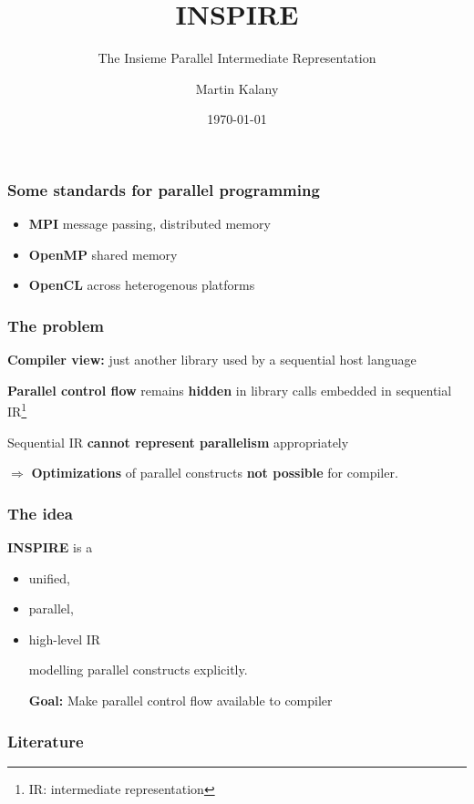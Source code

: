 \documentclass{beamer}
\title{INSPIRE}
\subtitle{The Insieme Parallel Intermediate Representation}
\author{Martin Kalany}
\institute
{
  Graduate student in Computer Science\\
  Vienna University of Technology\\
}
\date{\today}
\newcommand\fR[1]{\textcolor{red!80!black}{\textbf{#1}}}
\newcommand\fB[1]{\textcolor{blue!80!black}{\textbf{#1}}}
\newcommand\fG[1]{\textcolor{green!70!black}{\textbf{#1}}}
\begin{document}
\maketitle

\begin{frame}
\frametitle{Some standards for parallel programming}
\begin{itemize}
\item \fB{MPI} message passing, distributed memory
\item \fB{OpenMP} shared memory
\item \fB{OpenCL} across heterogenous platforms
\end{itemize}
\end{frame}

\begin{frame}
\frametitle{The problem}

\fB{Compiler view:} just another library used by a sequential host language

\bigskip\pause
\fR{Parallel control flow} remains \fR{hidden} in library calls embedded in sequential IR\footnote{IR: intermediate representation }

\bigskip\pause
Sequential IR \fR{cannot represent parallelism} appropriately

\bigskip\pause
$\Rightarrow$ \fR{Optimizations} of parallel constructs \fR{not possible} for compiler. 
\end{frame}

\begin{frame}
\frametitle{The idea}
\fB{INSPIRE} is a
\begin{itemize}
\item unified,
\item parallel,
\item high-level IR

\smallskip
modelling parallel constructs explicitly.

\bigskip\pause
\fG{Goal:} Make parallel control flow available to compiler
\end{itemize}

\end{frame}

\begin{frame}
\cite{JordanPTKF13}
\end{frame}

\begin{frame}[allowframebreaks]
\frametitle<presentation>{Literature}    
\printbibliography
\end{frame} 	 
\end{document}
